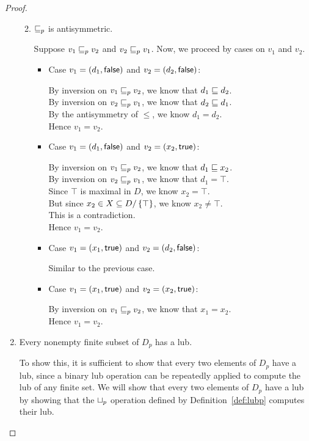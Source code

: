 \begin{proof}
\begin{enumerate}
\begin{enumerate}
\begin{itemize}
  \end{itemize}

\item $\sqsubseteq_p$ is antisymmetric. 

  Suppose $v_1 \sqsubseteq_p v_2$ and $v_2 \sqsubseteq_p v_1$. Now, we proceed by cases on $v_1$ and $v_2$. 
  \begin{itemize}
  \item Case $v_1 = (d_1, \textsf{false})$ and $v_2 = (d_2, \textsf{false})$: 
    
    By inversion on $v_1 \sqsubseteq_p v_2$, we know that $d_1 \sqsubseteq d_2$. \\ 
    By inversion on $v_2 \sqsubseteq_p v_1$, we know that $d_2 \sqsubseteq d_1$. \\ 
    By the antisymmetry of $\leq$, we know $d_1 = d_2$. \\ 
    Hence $v_1 = v_2$. 

  \item Case $v_1 = (d_1, \textsf{false})$ and $v_2 = (x_2, \textsf{true})$: 

    By inversion on $v_1 \sqsubseteq_p v_2$, we know that $d_1 \sqsubseteq x_2$. \\ 
    By inversion on $v_2 \sqsubseteq_p v_1$, we know that $d_1 = \top$. \\ 
    Since $\top$ is maximal in $D$, we know $x_2 = \top$. \\ 
    But since $x_2 \in X \subseteq D/\left\{\top\right\}$, we know $x_2 \not= \top$. \\ 
    This is a contradiction. \\
    Hence $v_1 = v_2$. 
    
  \item Case $v_1 = (x_1, \textsf{true})$ and $v_2 = (d_2, \textsf{false})$: 

    Similar to the previous case. 

  \item Case $v_1 = (x_1, \textsf{true})$ and $v_2 = (x_2, \textsf{true})$: 

    By inversion on $v_1 \sqsubseteq_p v_2$, we know that $x_1 = x_2$. \\
    Hence $v_1 = v_2$. 
  \end{itemize}
\end{enumerate}

\item Every nonempty finite subset of $D_p$ has a lub.

To show this, it is sufficient to show that every two elements of
$D_p$ have a lub, since a binary lub operation can be repeatedly
applied to compute the lub of any finite set.  We will show that every
two elements of $D_p$ have a lub by showing that the $ \sqcup_p $
operation defined by Definition~\ref{def:lubp} computes their lub.


\end{enumerate}
\end{proof}
